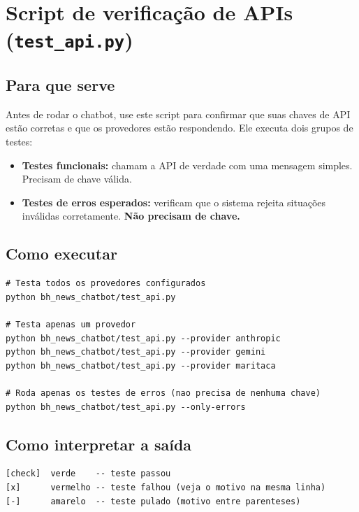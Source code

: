 \documentclass[12pt,a4paper]{article}
\begin{document}
\section{Script de verificação de APIs (\texttt{test\_api.py})}

\subsection{Para que serve}

Antes de rodar o chatbot, use este script para confirmar que suas chaves de API estão
corretas e que os provedores estão respondendo. Ele executa dois grupos de testes:

\begin{itemize}
  \item \textbf{Testes funcionais:} chamam a API de verdade com uma mensagem simples.
    Precisam de chave válida.
  \item \textbf{Testes de erros esperados:} verificam que o sistema rejeita situações
    inválidas corretamente. \textbf{Não precisam de chave.}
\end{itemize}

\subsection{Como executar}

\begin{lstlisting}
# Testa todos os provedores configurados
python bh_news_chatbot/test_api.py

# Testa apenas um provedor
python bh_news_chatbot/test_api.py --provider anthropic
python bh_news_chatbot/test_api.py --provider gemini
python bh_news_chatbot/test_api.py --provider maritaca

# Roda apenas os testes de erros (nao precisa de nenhuma chave)
python bh_news_chatbot/test_api.py --only-errors
\end{lstlisting}

\subsection{Como interpretar a saída}

\begin{lstlisting}
[check]  verde    -- teste passou
[x]      vermelho -- teste falhou (veja o motivo na mesma linha)
[-]      amarelo  -- teste pulado (motivo entre parenteses)
\end{lstlisting}
\end{document}
